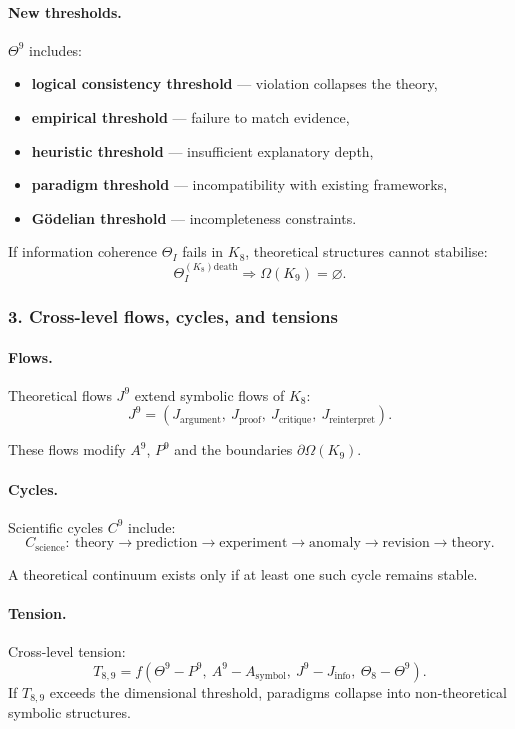 \paragraph{New thresholds.}
$\Theta^9$ includes:
\begin{itemize}
  \item \textbf{logical consistency threshold} — violation collapses the theory,
  \item \textbf{empirical threshold} — failure to match evidence,
  \item \textbf{heuristic threshold} — insufficient explanatory depth,
  \item \textbf{paradigm threshold} — incompatibility with existing frameworks,
  \item \textbf{Gödelian threshold} — incompleteness constraints.
\end{itemize}

If information coherence $\Theta_I$ fails in $K_8$, theoretical structures
cannot stabilise:
\[
\Theta_I^{(K_8)\mathrm{death}} \Rightarrow \Omega(K_9)=\varnothing.
\]

\subsubsection{3. Cross-level flows, cycles, and tensions}

\paragraph{Flows.}
Theoretical flows $J^9$ extend symbolic flows of $K_8$:
\[
J^9 = (J_{\mathrm{argument}},\ J_{\mathrm{proof}},\
       J_{\mathrm{critique}},\ J_{\mathrm{reinterpret}}).
\]

These flows modify $A^9$, $P^9$ and the boundaries $\partial\Omega(K_9)$.

\paragraph{Cycles.}
Scientific cycles $C^9$ include:
\[
C_{\mathrm{science}}:\ 
\text{theory} \rightarrow \text{prediction} \rightarrow \text{experiment}
\rightarrow \text{anomaly} \rightarrow \text{revision} \rightarrow \text{theory}.
\]

A theoretical continuum exists only if at least one such cycle remains stable.

\paragraph{Tension.}
Cross-level tension:
\[
T_{8,9} =
f(\Theta^9 - P^9,\ A^9 - A_{\mathrm{symbol}},\ 
  J^9 - J_{\mathrm{info}},\ \Theta_8 - \Theta^9).
\]
If $T_{8,9}$ exceeds the dimensional threshold, paradigms collapse into
non-theoretical symbolic structures.

